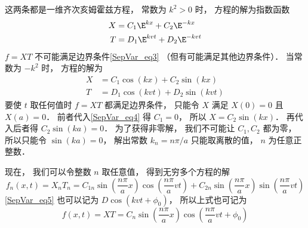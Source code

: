 这两条都是一维齐次亥姆霍兹方程， 常数为 $k^2>0$ 时， 方程的解为指数函数
\begin{align}
X &= C_1 \E^{kx} + C_2 \E^{-kx}\\
T &= D_1 \E^{kvt} + D_2 \E^{-kvt}
\end{align}
$f = XT$ 不可能满足边界条件\autoref{SepVar_eq3}  （但有可能满足其他边界条件）． 当常数为 $-k^2$ 时， 方程的解为
\begin{align}\label{SepVar_eq4}
X &= C_1 \cos(kx) + C_2 \sin(kx)\\
\label{SepVar_eq5}T &= D_1 \cos(kvt) + D_2 \sin(kvt)
\end{align}
要使 $t$ 取任何值时 $f = XT$ 都满足边界条件， 只能令 $X$ 满足 $X(0) = 0$ 且 $X(a) = 0$． 前者代入\autoref{SepVar_eq4} 得 $C_1 = 0$， 所以 $X = C_2\sin(kx)$． 再代入后者得 $C_2\sin(ka) = 0$． 为了获得非零解， 我们不可能让 $C_1, C_2$ 都为零， 所以只能令 $\sin(ka) = 0$， 解出常数 $k_n = n\pi/a$ 只能取离散的值， $n$ 为任意正整数．

现在， 我们可以令整数 $n$ 取任意值， 得到无穷多个方程的解
\begin{equation}
f_n(x, t) = X_n T_n = C_{1n} \sin(\frac{n\pi}{a}x)\cos(\frac{n\pi}{a} vt) + C_{2n}\sin(\frac{n\pi}{a}x)\sin(\frac{n\pi}{a}vt)
\end{equation}
\autoref{SepVar_eq5} 也可以记为 $D\cos(kvt+\phi_0)$， 所以上式也可记为
\begin{equation}
f(x, t) = XT = C_n\sin(\frac{n\pi}{a}x)\cos(\frac{n\pi}{a}vt + \phi_0)
\end{equation}

